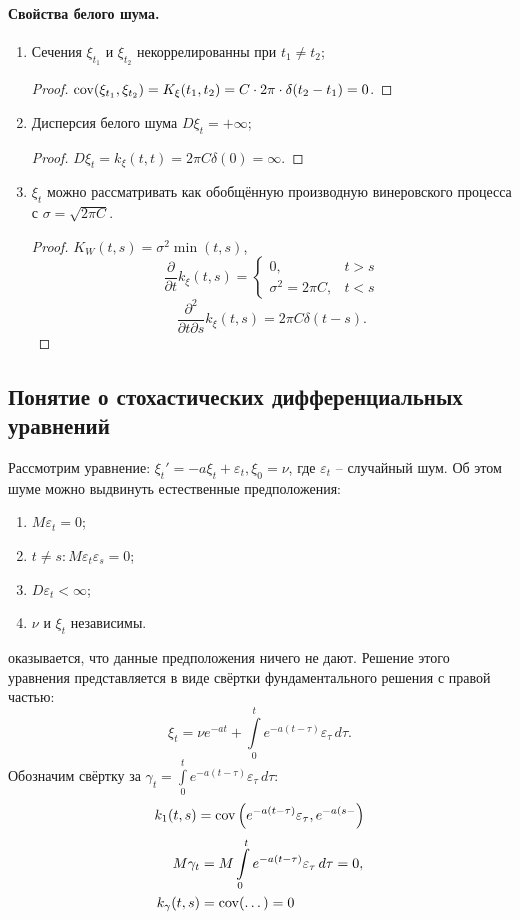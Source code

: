 \paragraph{Свойства белого шума.}
\begin{enumerate}
  \item Сечения $\xi_{t_1}$ и $\xi_{t_2}$ некоррелированны при $t_1 \neq t_2$;
    \begin{proof}
      $\operatorname{cov}(\xi_{t_1}, \xi_{t_2}) = K_\xi(t_1, t_2) = C\cdot 2\pi \cdot \delta(t_2 - t_1) = 0$.
    \end{proof}
  \item Дисперсия белого шума $D\xi_t = +\infty$;
    \begin{proof}
      $D\xi_t = k_\xi(t, t) = 2\pi C \delta(0) = \infty$.
    \end{proof}
  \item $\xi_t$ можно рассматривать как обобщённую производную винеровского процесса с 
    $\sigma = \sqrt{2\pi C}$.
    \begin{proof}
      $K_W (t, s) = \sigma^2 \min(t, s)$, 
      \[
        \dfrac{\partial }{\partial t} k_\xi(t, s) = \begin{cases}
          0, &t > s \\
          \sigma^2 = 2\pi C, & t < s
        \end{cases}
      \]
      \[
        \dfrac{\partial^2 }{\partial t \partial s} k_\xi(t, s) = 2\pi C \delta(t-s).
      \]
    \end{proof}
\end{enumerate}

\subsection{Понятие о стохастических дифференциальных уравнений}

Рассмотрим уравнение: $\xi_t' = -a \xi_t + \varepsilon_t, \xi_0 = \nu$, где $\varepsilon_t$ -- случайный шум.
Об этом шуме можно выдвинуть естественные предположения:
\begin{enumerate}
  \item $M\varepsilon_t = 0$;
  \item $t \neq s : M\varepsilon_t \varepsilon_s = 0$;
  \item $D\varepsilon_t < \infty$;
  \item $\nu$ и $\xi_t$ независимы.
\end{enumerate}
оказывается, что данные предположения ничего не дают.
Решение этого уравнения представляется в виде свёртки фундаментального решения с правой частью:
\[
  \xi_t = \nu e^{-a t} + \int\limits_0^t e^{-a(t-\tau)} \varepsilon_\tau \, d\tau.
\]
Обозначим свёртку за $\gamma_t = \int\limits_0^t e^{-a(t-\tau)} \varepsilon_\tau \, d\tau$:
\[
  k_1 (t, s) = \operatorname{cov} \left( e^{-a(t-\tau)} \varepsilon_\tau, e^{-a(s-} \right) 
\]
\begin{align*}
  M\gamma_t &= M\int\limits_0^t e^{-a(t-\tau)} \varepsilon_\tau \, d\tau = 0, \\
  k_\gamma(t, s) &= \operatorname{cov}( \dots ) = 0
\end{align*}

